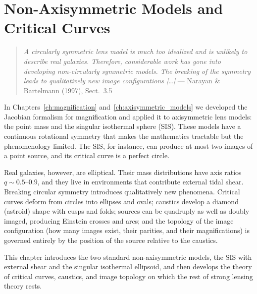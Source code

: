 
\chapter{Non-Axisymmetric Models and Critical Curves}
\label{ch:elliptical_models}

\begin{quote}
\textit{A circularly symmetric lens model is much too idealized and is unlikely to
describe real galaxies.  Therefore, considerable work has gone into developing
non-circularly symmetric models.  The breaking of the symmetry leads to
qualitatively new image configurations [\ldots]}
\hfill --- Narayan \& Bartelmann (1997), Sect.~3.5
\end{quote}

\noindent
In Chapters~\ref{ch:magnification} and~\ref{ch:axisymmetric_models} we
developed the Jacobian formalism for magnification and applied it to
axisymmetric lens models: the point mass and the singular isothermal
sphere (SIS).  These models have a continuous rotational symmetry that
makes the mathematics tractable but the phenomenology limited.  The SIS,
for instance, can produce at most two images of a point source, and its
critical curve is a perfect circle.

Real galaxies, however, are elliptical.  Their mass
distributions have axis ratios $q \sim 0.5$--$0.9$, and they live in
environments that contribute external tidal shear.  Breaking circular
symmetry introduces qualitatively new phenomena.  Critical curves
deform from circles into ellipses and ovals; caustics develop a
diamond (astroid) shape with cusps and folds; sources can be
quadruply as well as doubly imaged, producing Einstein crosses and
arcs; and the topology of the image configuration (how many images
exist, their parities, and their magnifications) is governed
entirely by the position of the source relative to the caustics.

This chapter introduces the two standard non-axisymmetric models,
the SIS with external shear and the singular isothermal ellipsoid, and
then develops the theory of critical curves, caustics, and image
topology on which the rest of strong lensing theory rests.

